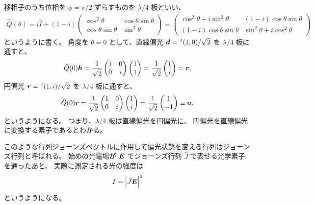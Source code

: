 \documentclass[9pt,dvipdfmx,a4paper]{jsarticle}
\begin{document}
移相子のうち位相を \(\phi = \pi/2\) ずらすものを \(\lambda/4\) 板といい、
\begin{align}
    \hat{Q}(\theta)
    =i\hat{I} + (1-i)\begin{pmatrix}
        \cos^2 \theta & \cos\theta\sin\theta\\
        \cos\theta\sin\theta & \sin^2\theta
    \end{pmatrix}
    =\begin{pmatrix}
        \cos^2\theta+i\sin^2\theta & (1-i)\cos\theta\sin\theta\\
        (1-i)\cos\theta\sin\theta & \sin^2\theta + i \cos^2\theta
    \end{pmatrix}
\end{align}
というように書く。
角度を \(\theta = 0\) として、直線偏光 \(\vb*{d}=\,^t(1,0)/\sqrt{2}\) を \(\lambda/4\) 板に通すと、
\begin{align}
    \hat{Q}(0)\vb*{h} =\frac{1}{\sqrt{2}}
    \begin{pmatrix}
        1   &   0\\
        0   &   i
    \end{pmatrix}
    \begin{pmatrix}
        1 \\ 1
    \end{pmatrix}
    = \frac{1}{\sqrt{2}}\begin{pmatrix}
        1 \\ i
    \end{pmatrix}
    =\vb*{r},
\end{align}
円偏光 \(\vb*{r} = \,^t(1,i)/\sqrt{2}\) を \(\lambda/4\) 板に通すと、
\begin{align}
    \hat{Q}(0)\vb*{r} = \frac{1}{\sqrt{2}}
    \begin{pmatrix}
        1   &   0\\
        0   &   i
    \end{pmatrix}
    \begin{pmatrix}
        1 \\ i
    \end{pmatrix}
    = \frac{1}{\sqrt{2}}\begin{pmatrix}
        1 \\ -1
    \end{pmatrix}
    \equiv\vb*{a},
\end{align}
というようになる。
つまり、\(\lambda/4\) 板は直線偏光を円偏光に、
円偏光を直線偏光に変換する素子であるとわかる。

このような行列ジョーンズベクトルに作用して偏光状態を変える行列はジョーンズ行列と呼ばれる。
始めの光電場が \(\vb*{E}\) でジョーンズ行列 \(\hat{J}\) で表せる光学素子を通ったあと、
実際に測定される光の強度は
\begin{align}
    I = \abs{\hat{J}\vb*{E}}^2
\end{align}
というようになる。
\end{document}
